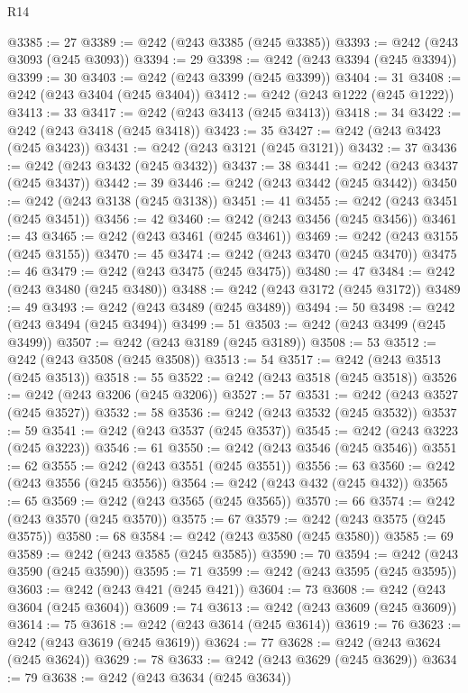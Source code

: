 \begin{lexlean}{R14}
\begin{coremodule}
@3385 := 27
@3389 := @242 (@243 @3385 (@245 @3385))
@3393 := @242 (@243 @3093 (@245 @3093))
@3394 := 29
@3398 := @242 (@243 @3394 (@245 @3394))
@3399 := 30
@3403 := @242 (@243 @3399 (@245 @3399))
@3404 := 31
@3408 := @242 (@243 @3404 (@245 @3404))
@3412 := @242 (@243 @1222 (@245 @1222))
@3413 := 33
@3417 := @242 (@243 @3413 (@245 @3413))
@3418 := 34
@3422 := @242 (@243 @3418 (@245 @3418))
@3423 := 35
@3427 := @242 (@243 @3423 (@245 @3423))
@3431 := @242 (@243 @3121 (@245 @3121))
@3432 := 37
@3436 := @242 (@243 @3432 (@245 @3432))
@3437 := 38
@3441 := @242 (@243 @3437 (@245 @3437))
@3442 := 39
@3446 := @242 (@243 @3442 (@245 @3442))
@3450 := @242 (@243 @3138 (@245 @3138))
@3451 := 41
@3455 := @242 (@243 @3451 (@245 @3451))
@3456 := 42
@3460 := @242 (@243 @3456 (@245 @3456))
@3461 := 43
@3465 := @242 (@243 @3461 (@245 @3461))
@3469 := @242 (@243 @3155 (@245 @3155))
@3470 := 45
@3474 := @242 (@243 @3470 (@245 @3470))
@3475 := 46
@3479 := @242 (@243 @3475 (@245 @3475))
@3480 := 47
@3484 := @242 (@243 @3480 (@245 @3480))
@3488 := @242 (@243 @3172 (@245 @3172))
@3489 := 49
@3493 := @242 (@243 @3489 (@245 @3489))
@3494 := 50
@3498 := @242 (@243 @3494 (@245 @3494))
@3499 := 51
@3503 := @242 (@243 @3499 (@245 @3499))
@3507 := @242 (@243 @3189 (@245 @3189))
@3508 := 53
@3512 := @242 (@243 @3508 (@245 @3508))
@3513 := 54
@3517 := @242 (@243 @3513 (@245 @3513))
@3518 := 55
@3522 := @242 (@243 @3518 (@245 @3518))
@3526 := @242 (@243 @3206 (@245 @3206))
@3527 := 57
@3531 := @242 (@243 @3527 (@245 @3527))
@3532 := 58
@3536 := @242 (@243 @3532 (@245 @3532))
@3537 := 59
@3541 := @242 (@243 @3537 (@245 @3537))
@3545 := @242 (@243 @3223 (@245 @3223))
@3546 := 61
@3550 := @242 (@243 @3546 (@245 @3546))
@3551 := 62
@3555 := @242 (@243 @3551 (@245 @3551))
@3556 := 63
@3560 := @242 (@243 @3556 (@245 @3556))
@3564 := @242 (@243 @432 (@245 @432))
@3565 := 65
@3569 := @242 (@243 @3565 (@245 @3565))
@3570 := 66
@3574 := @242 (@243 @3570 (@245 @3570))
@3575 := 67
@3579 := @242 (@243 @3575 (@245 @3575))
@3580 := 68
@3584 := @242 (@243 @3580 (@245 @3580))
@3585 := 69
@3589 := @242 (@243 @3585 (@245 @3585))
@3590 := 70
@3594 := @242 (@243 @3590 (@245 @3590))
@3595 := 71
@3599 := @242 (@243 @3595 (@245 @3595))
@3603 := @242 (@243 @421 (@245 @421))
@3604 := 73
@3608 := @242 (@243 @3604 (@245 @3604))
@3609 := 74
@3613 := @242 (@243 @3609 (@245 @3609))
@3614 := 75
@3618 := @242 (@243 @3614 (@245 @3614))
@3619 := 76
@3623 := @242 (@243 @3619 (@245 @3619))
@3624 := 77
@3628 := @242 (@243 @3624 (@245 @3624))
@3629 := 78
@3633 := @242 (@243 @3629 (@245 @3629))
@3634 := 79
@3638 := @242 (@243 @3634 (@245 @3634))

\end{coremodule}
\end{lexlean}
